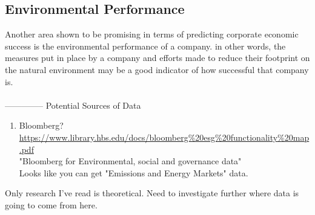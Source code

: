 \subsection{Environmental Performance}
{Another area shown to be promising in terms of predicting corporate economic success is the environmental performance of a company. in other words, the measures put in place by a company and efforts made to reduce their footprint on the natural environment may be a good indicator of how successful that company is. \\\\
--------------
Potential Sources of Data
\begin{enumerate}
\item{Bloomberg? }\\
\url {https://www.library.hbs.edu/docs/bloomberg%20esg%20functionality%20map.pdf}
\\
"Bloomberg for Environmental, social and governance data"\\
Looks like you can get "Emissions and Energy Markets" data.
\end{enumerate}
Only research I've read is theoretical. Need to investigate further where data is going to come from here.

}

